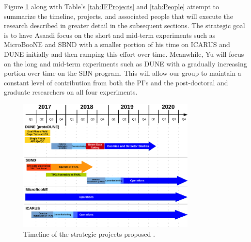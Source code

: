 Figure \ref{fig:IFTimeline} along with Table's \ref{tab:IFProjects} and \ref{tab:People} attempt to summarize the timeline, projects, and associated people that will execute the research described in greater detail in the subsequent sections. The strategic goal is to have Asaadi focus on the short and mid-term experiments such as MicroBooNE and SBND with a smaller portion of his time on ICARUS and DUNE initially and then ramping this effort over time. Meanwhile, Yu will focus on the long and mid-term experiments such as DUNE with a gradually increasing portion over time on the SBN program. This will allow our group to maintain a constant level of contribution from both the PI's and the post-doctoral and graduate researchers on all four experiments.


\begin{figure}[htb]
\centering
\includegraphics[width=0.80\textwidth]{images/Timeline.pdf}
\caption[]{Timeline of the strategic projects proposed .}
\label{fig:IFTimeline}
\end{figure}

